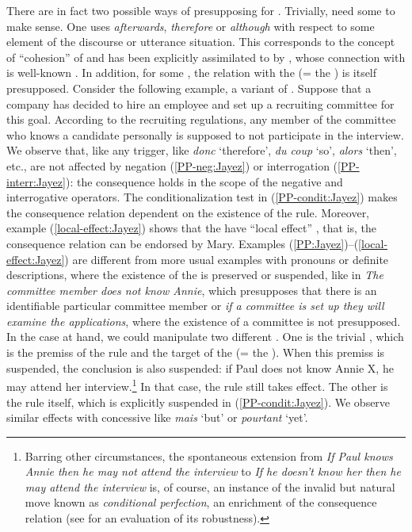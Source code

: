 \documentclass[output=paper,colorlinks,citecolor=brown]{langscibook}
\begin{document}
There are in fact two possible ways of presupposing for . Trivially,   need some  to make sense. One uses \textit{afterwards}, \textit{therefore} or \textit{although} with respect to some element of the discourse or utterance situation. This corresponds to the concept of ``cohesion'' of \citet{HallidayandHasan:1976} and has been explicitly assimilated to  by \citet{Berrendonner:1993}, whose connection with  is well-known \citep{vanderSandt:1992,Geurts:1999}. In addition, for some , the relation with the  (= the ) is itself presupposed. Consider the following example, a variant of \citet[example 13]{DargnatandJayez:2020}. Suppose that a company has decided to hire an employee and set up a recruiting committee for this goal. According to the recruiting regulations, any member of the committee who knows a candidate personally is supposed to not participate in the interview. We observe that, like any  trigger,  like \textit{donc} `therefore', \textit{du coup} `so', \textit{alors} `then', etc., are not affected by negation (\ref{PP-neg:Jayez}) or interrogation (\ref{PP-interr:Jayez}): the consequence  holds in the scope of the negative and interrogative operators. The conditionalization test in (\ref{PP-condit:Jayez}) makes the consequence relation dependent on the existence of the rule. Moreover, example (\ref{local-effect:Jayez}) shows that the  have ``local effect'' \citep{Tonhauseretal:2013}, that is, the consequence relation can be endorsed by Mary. Examples (\ref{PP:Jayez})--(\ref{local-effect:Jayez}) are different from more usual examples with pronouns or definite descriptions, where the existence of the  is preserved or suspended, like in \textit{The committee member does not know Annie}, which presupposes that there is an identifiable particular committee member or \textit{if a committee is set up they will examine the applications}, where the existence of a committee is not presupposed. In the case at hand, we could manipulate two different . One is the trivial , which is the premiss of the rule and the target of the  (= the ). When this premiss is suspended, the conclusion is also suspended: if Paul does not know Annie X, he may attend her interview.\footnote{Barring other circumstances, the spontaneous extension from \textit{If Paul knows Annie then he may not attend the interview} to \textit{If he doesn't know her then he may attend the interview} is, of course, an instance of the invalid but natural move known as \textit{conditional perfection}, an enrichment of the consequence relation (see \citealt{CarianiandRips:2023} for an evaluation of its robustness).} In that case, the rule still takes effect. The other  is the rule itself, which is explicitly suspended in (\ref{PP-condit:Jayez}). We observe similar effects with concessive  like \textit{mais} `but' or \textit{pourtant} `yet'.
\end{document}
